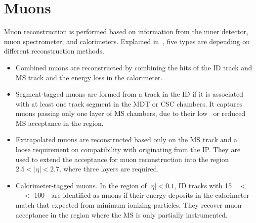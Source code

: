 \section{Muons}
\label{sec:mu}

\par Muon reconstruction is performed based on information from the inner detector, muon spectrometer, and calorimeters. Explained in~\cite{Aad:2016jkr}, five types are depending on different reconstruction methods.

\begin{itemize}
    \item Combined muons are reconstructed by combining the hits of the ID track and MS track and the energy loss in the calorimeter.
    \item Segment-tagged muons are formed from a track in the ID if it is associated with at least one track segment in the MDT or CSC chambers. It captures muons passing only one layer of MS chambers, due to their low \pt~or reduced MS acceptance in the region.
    \item Extrapolated muons are reconstructed based only on the MS track and a loose requirement on compatibility with originating from the IP. They are used to extend the acceptance for muon reconstruction into the region $2.5 <|\eta| < 2.7$, where three layers are required.
    \item Calorimeter-tagged muons. In the region of $|\eta| < 0.1$, ID tracks with 15~\GeV~$<$~\pt~$<$ 100~\GeV~are identified as muons if their energy deposits in the calorimeter match that expected from minimum ionizing particles. They recover muon acceptance in the region where the MS is only partially instrumented.
\end{itemize}

